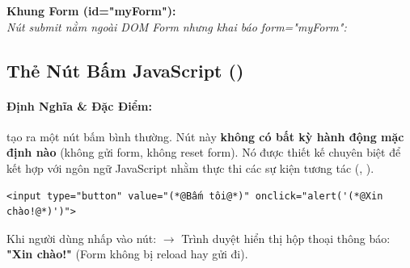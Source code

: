 \begin{browserWindow}[Mô Phỏng Trình Duyệt: Nút Submit Nằm Bên Ngoài Form Kết Nối Qua form="id"]
\sffamily\small
\textbf{Khung Form (id="myForm"):}  \\[6pt]
\textcolor{codeComment}{\small\textit{Nút submit nằm ngoài DOM Form nhưng khai báo form="myForm":}} \quad
{}
\end{browserWindow}

\subsection{Thẻ Nút Bấm JavaScript ()}
\label{subsec:input_button}

\paragraph{Định Nghĩa \& Đặc Điểm:}
 tạo ra một nút bấm bình thường. Nút này \textbf{không có bất kỳ hành động mặc định nào} (không gửi form, không reset form). Nó được thiết kế chuyên biệt để kết hợp với ngôn ngữ JavaScript nhằm thực thi các sự kiện tương tác (, ).

\begin{codeWindow}[Cú pháp nút input type="button" kích hoạt sự kiện onclick]
\begin{lstlisting}[language=HTML5]
<input type="button" value="(*@Bấm tôi@*)" onclick="alert('(*@Xin chào!@*)')">
\end{lstlisting}
\end{codeWindow}

\begin{browserWindow}
\sffamily\small
Khi người dùng nhấp vào nút:
 $\rightarrow$ Trình duyệt hiển thị hộp thoại thông báo: \textcolor{accentOrange}{\textbf{"Xin chào!"}} (Form không bị reload hay gửi đi).
\end{browserWindow}

